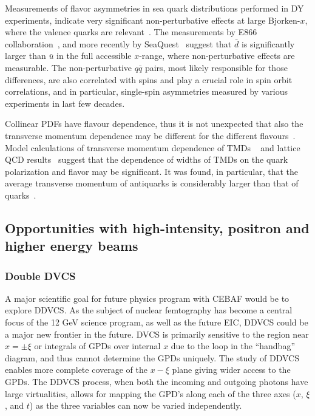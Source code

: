 Measurements of flavor asymmetries in sea quark distributions performed in DY experiments, indicate very significant non-perturbative effects at large Bjorken-$x$, where the valence quarks are relevant~\cite{Alberg:2017ijg}.
 The measurements by E866 collaboration~\cite{Garvey:2001yq}, and more recently by SeaQuest~\cite{Nagai:2017dhp} suggest that $\bar{d}$ is significantly larger than $\bar{u}$ in the full accessible $x$-range, where non-perturbative effects are measurable.
The non-perturbative $q\bar{q}$ pairs, most likely responsible for those differences, are also correlated with spins and play a crucial role in spin orbit correlations, and in particular, single-spin asymmetries measured by various experiments in last few decades.

Collinear PDFs have flavour dependence, thus it is not unexpected that also
the transverse momentum dependence may be different for the different
flavours~\cite{Signori:2013mda}. Model calculations of transverse momentum dependence of TMDs ~\cite{Pasquini:2008ax,Lu:2004au,Anselmino:2006yc,Bourrely:2010ng} and lattice QCD results~\cite{Hagler:2009mb,Musch:2010ka} suggest that the dependence of widths of TMDs on the quark polarization and flavor may be
significant. It was found, in particular, that the average
transverse momentum of antiquarks is considerably larger than that of
quarks~\cite{Wakamatsu:2009fn,Schweitzer:2012hh}. 


\subsection{Opportunities with high-intensity, positron and higher energy beams}

\subsubsection*{Double DVCS}
A major scientific goal for future physics program with CEBAF would be to explore DDVCS. 
As the subject of nuclear femtography has become a central focus of the 12 GeV science program, as well as the future EIC, DDVCS could be a major new frontier in the future. 
DVCS is primarily sensitive to the region near $x=\pm\xi$ or integrals of GPDs over internal $x$ due to the loop in the ``handbag'' diagram, and thus
cannot determine the GPDs uniquely.
The study of DDVCS enables more complete coverage of the $x-\xi$ plane giving wider access to the GPDs. 
The DDVCS process, when both the incoming and outgoing photons have large virtualities, allows for mapping the GPD's along each of the three axes ($x$, $\xi$, and $t$) as the three variables can now be varied independently. 

